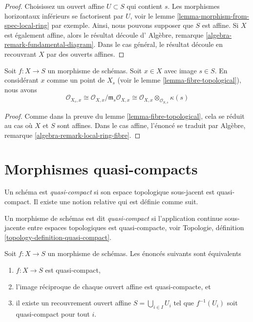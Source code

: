 \begin{proof}
Choisissez un ouvert affine $U \subset S$ qui contient $s$. Les
morphismes horizontaux inférieurs se factorisent par $U$, voir
le lemme \ref{lemma-morphism-from-spec-local-ring} par exemple. Ainsi,
nous pouvons supposer que $S$ est affine. Si $X$ est également affine,
alors le résultat découle d'
Algèbre, remarque \ref{algebra-remark-fundamental-diagram}. Dans
le cas général, le résultat découle en recouvrant $X$ par des ouverts affines.
\end{proof}

\begin{lemma}
\label{lemma-local-ring-fibre}
Soit $f : X \to S$ un morphisme de schémas. Soit $x \in X$ avec
image $s \in S$. En considérant $x$ comme un point de $X_s$ (voir
le lemme \ref{lemma-fibre-topological}), nous avons
$$
\mathcal{O}_{X_s, x} \cong
\mathcal{O}_{X, x}/\mathfrak m_s\mathcal{O}_{X, x} \cong
\mathcal{O}_{X, x} \otimes_{\mathcal{O}_{S, s}} \kappa(s)
$$
\end{lemma}

\begin{proof}
Comme dans la preuve du lemme \ref{lemma-fibre-topological}, cela se
réduit au cas où $X$ et $S$ sont affines. Dans le cas affine, l'énoncé se
traduit par Algèbre, remarque \ref{algebra-remark-local-ring-fibre}.
\end{proof}







\section{Morphismes quasi-compacts}
\label{section-quasi-compact}

\noindent
Un schéma est {\it quasi-compact} si son espace topologique sous-jacent est
quasi-compact. Il existe une notion relative qui est définie comme suit.

\begin{definition}
\label{definition-quasi-compact}
Un morphisme de schémas est dit {\it quasi-compact} si
l'application continue sous-jacente entre espaces topologiques
est quasi-compacte,
voir Topologie, définition \ref{topology-definition-quasi-compact}.
\end{definition}

\begin{lemma}
\label{lemma-quasi-compact-affine}
Soit $f : X \to S$ un morphisme de schémas. Les
énoncés suivants sont équivalents
\begin{enumerate}
\item $f : X \to S$ est quasi-compact,
\item l'image réciproque de chaque ouvert affine est quasi-compacte,
et \item il existe un recouvrement ouvert affine $S = \bigcup_{i \in I} U_i$
tel que $f^{-1}(U_i)$ soit quasi-compact pour tout $i$.
\end{enumerate}
\end{lemma}

